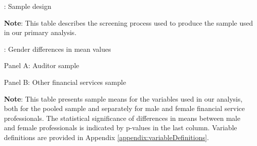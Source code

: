 \documentclass[11pt]{article}
\begin{document}
\clearpage

\clearpage
\begin{landscape}
\begin{table}[!htbp] 
    
    \begin{threeparttable}[b]    
        
        \captionsetup{labelfont=bf, singlelinecheck=off, justification=raggedright, labelsep=none}
        \caption{: Sample design}

        \raggedright
        \hspace*{-\leftmargin}
    
        \normalsize
        
        
        \begin{tablenotes}
            \footnotesize
            \item \textbf{Note}: This table describes the screening process used to produce the sample used in our primary analysis.   
        \end{tablenotes}
        \label{table:sampleDesign}
    \end{threeparttable}
\end{table}
\end{landscape}

\clearpage
\begin{table}[!htbp] 
    
    \begin{threeparttable}[b]    
        
        \captionsetup{labelfont=bf, singlelinecheck=off, justification=raggedright, labelsep=none}
        \caption{: Gender differences in mean values}

        \raggedright
        \hspace*{-\leftmargin}


        \small

        Panel A: Auditor sample
        

        Panel B: Other financial services sample
        
        
        \begin{tablenotes}
            \footnotesize
            \item \textbf{Note}: This table presents sample means for the variables used in our analysis, both for the pooled sample and separately for male and female financial service professionals. The statistical significance of differences in means between male and female professionals is indicated by p-values in the last column. Variable definitions are provided in Appendix \ref{appendix:variableDefinitions}.   
        \end{tablenotes}
        \label{table:summaryStats}
    \end{threeparttable}
\end{table}
\end{document}
